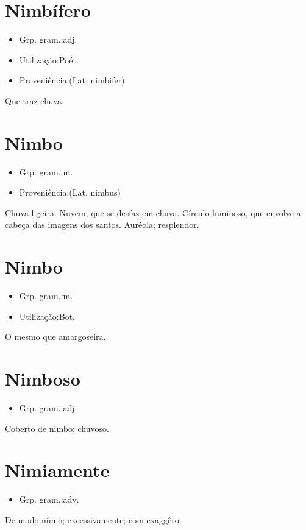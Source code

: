 \section{Nimbífero}
\begin{itemize}
\item {Grp. gram.:adj.}
\end{itemize}
\begin{itemize}
\item {Utilização:Poét.}
\end{itemize}
\begin{itemize}
\item {Proveniência:(Lat. \textunderscore nimbifer\textunderscore )}
\end{itemize}
Que traz chuva.
\section{Nimbo}
\begin{itemize}
\item {Grp. gram.:m.}
\end{itemize}
\begin{itemize}
\item {Proveniência:(Lat. \textunderscore nimbus\textunderscore )}
\end{itemize}
Chuva ligeira.
Nuvem, que se desfaz em chuva.
Círculo luminoso, que envolve a cabeça das imagens dos santos.
Auréola; resplendor.
\section{Nimbo}
\begin{itemize}
\item {Grp. gram.:m.}
\end{itemize}
\begin{itemize}
\item {Utilização:Bot.}
\end{itemize}
O mesmo que \textunderscore amargoseira\textunderscore .
\section{Nimboso}
\begin{itemize}
\item {Grp. gram.:adj.}
\end{itemize}
Coberto de nimbo; chuvoso.
\section{Nimiamente}
\begin{itemize}
\item {Grp. gram.:adv.}
\end{itemize}
De modo nímio; excessivamente; com exaggêro.
